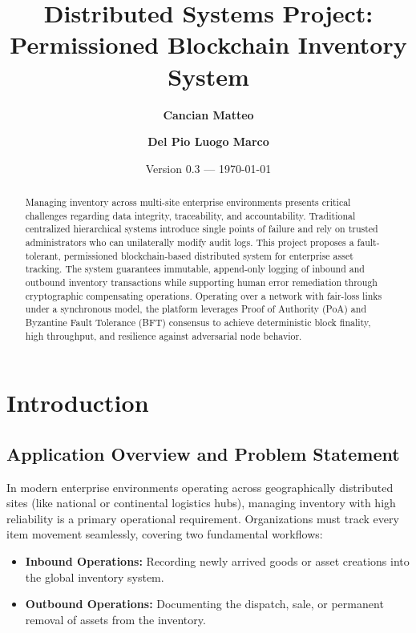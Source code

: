 \documentclass[11pt,a4paper]{memoir}
\title{\textbf{Distributed Systems Project: \\ Permissioned Blockchain Inventory System}}
\author{\textbf{Cancian Matteo} \quad \and \quad \textbf{Del Pio Luogo Marco}}
\date{Version 0.3 --- \today}
\begin{document}
\maketitle

\begin{abstract}
Managing inventory across multi-site enterprise environments presents critical challenges regarding data integrity, traceability, and accountability. 
Traditional centralized hierarchical systems introduce single points of failure and rely on trusted administrators who can unilaterally modify audit logs. 
This project proposes a fault-tolerant, permissioned blockchain-based distributed system for enterprise asset tracking. The system guarantees immutable, append-only logging of inbound and outbound inventory transactions while supporting human error remediation through cryptographic compensating operations. Operating over a network with fair-loss links under a synchronous model, the platform leverages Proof of Authority (PoA) and Byzantine Fault Tolerance (BFT) consensus to achieve deterministic block finality, high throughput, and resilience against adversarial node behavior.
\end{abstract}

\clearpage
\tableofcontents
\clearpage

\chapter{Introduction}\label{ch:intro}

\section{Application Overview and Problem Statement}
In modern enterprise environments operating across geographically distributed sites (like national or continental logistics hubs), managing inventory with high reliability is a primary operational requirement. 
Organizations must track every item movement seamlessly, covering two fundamental workflows:
\begin{itemize}
    \item \textbf{Inbound Operations:} Recording newly arrived goods or asset creations into the global inventory system.
    \item \textbf{Outbound Operations:} Documenting the dispatch, sale, or permanent removal of assets from the inventory.
\end{itemize}
\end{document}
